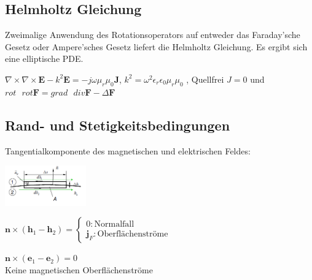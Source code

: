 \documentclass[english]{latex4ei/latex4ei_sheet}
\begin{document}
\begin{sectionbox}
    \subsection{Helmholtz Gleichung}
    Zweimalige Anwendung des Rotationsoperators auf entweder das Faraday'sche Gesetz oder Ampere'sches Gesetz liefert die Helmholtz Gleichung. Es ergibt sich eine elliptische PDE.

    $\nabla\times\nabla\times \mathbf{E} -k^2 \mathbf{E} = -j\omega\mu_r\mu_0 \mathbf{J}$, \quad
    $k^2 = \omega^2 \epsilon_r\epsilon_0\mu_r\mu_0$
    , Quellfrei $J=0$ und\\
    $rot\text{ }rot\mathbf{F} = grad\text{ } div \mathbf{F} - \Delta\mathbf{F}$

\end{sectionbox}
\begin{sectionbox}
    \subsection{Rand- und Stetigkeitsbedingungen}
    Tangentialkomponente des magnetischen und elektrischen Feldes:\\
    \vspace{-0.28cm}
    \begin{center}\includegraphics[width = 3.5cm]{./img/tang_rand.png}\end{center}
    \begin{emphbox}
        $\mathbf{n} \times (\mathbf{h}_1 - \mathbf{h}_2) =
            \begin{cases}
                0 : \text{Normalfall} \\
                \mathbf{j}_F : \text{Oberflächenströme}
            \end{cases}$
    \end{emphbox}

    \begin{emphbox}
        $\mathbf{n} \times (\mathbf{e}_1 -\mathbf{e}_2) = 0$\\
        Keine magnetischen Oberflächenströme
    \end{emphbox}


\end{sectionbox}
\end{document}
